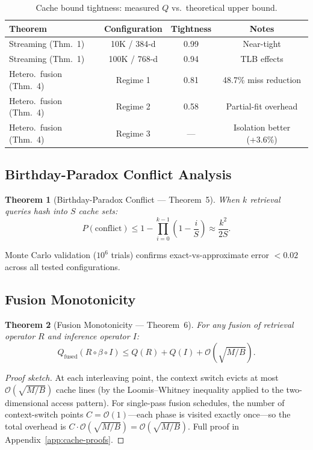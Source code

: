\documentclass{article}
\newtheorem{theorem}{Theorem}
\theoremstyle{definition}
\theoremstyle{remark}
\newcommand{\BigO}{\mathcal{O}}
\newcommand{\Qfused}{Q_{\mathrm{fused}}}
\begin{document}
\begin{table}[t]
\centering
\caption{Cache bound tightness: measured $Q$ vs.\ theoretical upper bound.}\label{tab:cache-tightness}
\smallskip
\begin{tabular}{@{}lccc@{}}
\toprule
\textbf{Theorem} & \textbf{Configuration} & \textbf{Tightness} & \textbf{Notes} \\
\midrule
Streaming (Thm.~1) & 10K / 384-d & 0.99 & Near-tight \\
Streaming (Thm.~1) & 100K / 768-d & 0.94 & TLB effects \\
Hetero.\ fusion (Thm.~4) & Regime 1 & 0.81 & 48.7\% miss reduction \\
Hetero.\ fusion (Thm.~4) & Regime 2 & 0.58 & Partial-fit overhead \\
Hetero.\ fusion (Thm.~4) & Regime 3 & --- & Isolation better (+3.6\%) \\
\bottomrule
\end{tabular}
\end{table}

\subsection{Birthday-Paradox Conflict Analysis}

\begin{theorem}[Birthday-Paradox Conflict --- Theorem~5]\label{thm:birthday-main}
When $k$ retrieval queries hash into $S$ cache sets:
\[
  P(\text{conflict}) \leq 1 - \prod_{i=0}^{k-1}\left(1 - \frac{i}{S}\right) \approx \frac{k^2}{2S}.
\]
\end{theorem}

Monte Carlo validation ($10^6$ trials) confirms exact-vs-approximate error $< 0.02$ across all tested configurations.

\subsection{Fusion Monotonicity}

\begin{theorem}[Fusion Monotonicity --- Theorem~6]\label{thm:fusion-monotonicity}
For any fusion of retrieval operator $R$ and inference operator $I$:
\[
  \Qfused(R \circ \beta \circ I) \leq Q(R) + Q(I) + \BigO\!\left(\sqrt{M/B}\right).
\]
\end{theorem}

\begin{proof}[Proof sketch]
At each interleaving point, the context switch evicts at most $\BigO(\sqrt{M/B})$ cache lines (by the Loomis--Whitney inequality applied to the two-dimensional access pattern).
For single-pass fusion schedules, the number of context-switch points $C = \BigO(1)$---each phase is visited exactly once---so the total overhead is $C \cdot \BigO(\sqrt{M/B}) = \BigO(\sqrt{M/B})$.
Full proof in Appendix~\ref{app:cache-proofs}.
\end{proof}
\end{document}

